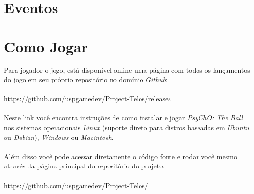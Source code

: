 \section{Eventos}
\label{sec:eventos}


\section{Como Jogar}
\label{sec:how_to_play}


Para jogador o jogo, está disponivel online uma página com todos os lançamentos do jogo em seu próprio repositório no domínio \textit{Github}:
\\~\\
\url{https://github.com/uspgamedev/Project-Telos/releases}
\\~\\
Neste link você encontra instruções de como instalar e jogar \textit{PsyChO: The Ball} nos sistemas operacionais \textit{Linux} (suporte direto para distros baseadas em \textit{Ubuntu} ou \textit{Debian}), \textit{Windows} ou \textit{Macintosh}.
\\~\\
Além disso você pode acessar diretamente o código fonte e rodar você mesmo através da página principal do repositório do projeto:
\\~\\
\url{https://github.com/uspgamedev/Project-Telos/}
